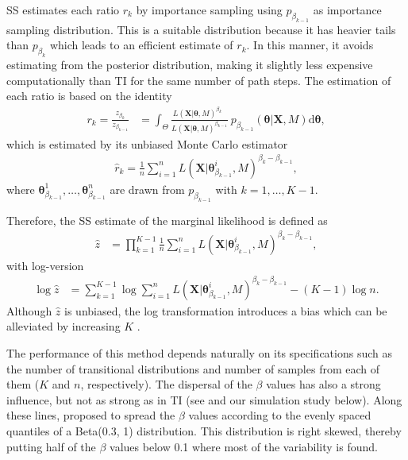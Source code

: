 \documentclass[aps,reprint,amsmath,amssymb,showpacs,showkeys]{revtex4-1}%
\begin{document}
SS estimates each ratio $r_k$ by importance sampling using $p_{\beta_{k-1}}$ as importance sampling distribution.  This is a suitable distribution because it has heavier tails than $p_{\beta_{k}}$ which leads to an efficient estimate of $r_k$.  In this manner, it avoids estimating from the posterior distribution, making it slightly less expensive computationally than TI for the same number of path steps.  The estimation of each ratio is based on the identity
\begin{align*}
r_k = \frac{z_{\beta_{k}}}{z_{\beta_{k-1}}} &= \int_{\Theta}\frac{L(\bm{X}|\bm{\theta},M)^{\beta_{k \quad}}}{L(\bm{X}|\bm{\theta},M)^{\beta_{k-1}}} \: p_{\beta_{k-1}}(\bm{\theta}|\bm{X},M) \text{d}\bm{\theta}, 
\end{align*}
which is estimated by its unbiased Monte Carlo estimator
\begin{align*}
\widehat{r}_k = \frac{1}{n} \sum_{i = 1}^{n}  L( \bm X | \bm{\theta}_{\!\beta_{k-1}}^{i}, M)^{\beta_{k}-\beta_{k-1}},
\end{align*}
where $\bm{\theta}_{\!\beta_{k-1}}^{1}, \dots, \bm{\theta}_{\!\beta_{k-1}}^{n}$ are drawn from $p_{\beta_{k-1}}$ with $k = 1, \dots, K-1$. 

Therefore,  the SS estimate of the marginal likelihood is defined as 
\begin{align*}
\widehat{z} &= \prod_{k=1}^{K-1}\frac{1}{n} \sum_{i = 1}^{n}  L( \bm X | \bm{\theta}_{\!\beta_{k-1}}^{i}, M)^{\beta_{k}-\beta_{k-1}},
\end{align*}
with log-version
\begin{align*}
\log\widehat{z} &= \sum_{k=1}^{K-1} \log \sum_{i = 1}^{n}  L( \bm X | \bm{\theta}_{\!\beta_{k-1}}^{i}, M)^{\beta_{k}-\beta_{k-1}} - (K-1) \log n.
\end{align*}
Although $\widehat{z}$ is unbiased, the log transformation introduces a bias which can be alleviated by increasing $K$ \citep{Xie:Lewis:Fan:Kuo:Chen:2011}.

The performance of this method depends naturally on its specifications such as the number of transitional distributions and number of samples from each of them ($K$ and $n$, respectively).  The dispersal of the $\beta$ values has also a strong influence, but not as strong as in TI (see \cite{Xie:Lewis:Fan:Kuo:Chen:2011} and our simulation study below).  Along these lines, \cite{Xie:Lewis:Fan:Kuo:Chen:2011} proposed to spread the $\beta$ values according to the evenly spaced quantiles of a Beta(0.3, 1) distribution.  This distribution is right skewed, thereby putting half of the $\beta$ values below 0.1 where most of the variability  is found.    
\end{document}
